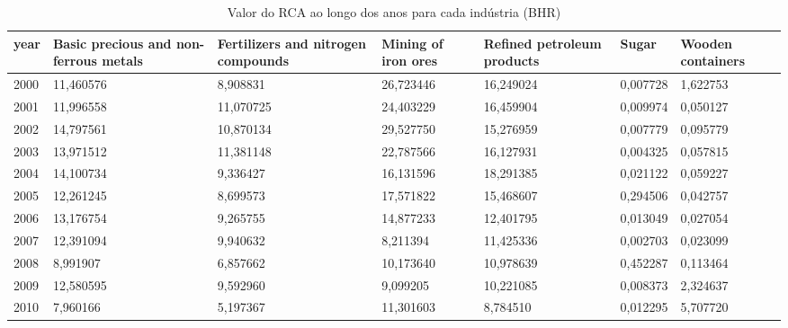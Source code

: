 \begin{table}
\centering
\caption{Valor do RCA ao longo dos anos para cada indústria (BHR)}
\begin{tabular}{p{1cm}p{2cm}p{2cm}p{2cm}p{2cm}p{2cm}p{2cm}}
\toprule
 year &  Basic precious and non-ferrous metals &  Fertilizers and nitrogen compounds &  Mining of iron ores &  Refined petroleum products &    Sugar &  Wooden containers \\
\midrule
 2000 &                              11,460576 &                            8,908831 &            26,723446 &                   16,249024 & 0,007728 &           1,622753 \\
 2001 &                              11,996558 &                           11,070725 &            24,403229 &                   16,459904 & 0,009974 &           0,050127 \\
 2002 &                              14,797561 &                           10,870134 &            29,527750 &                   15,276959 & 0,007779 &           0,095779 \\
 2003 &                              13,971512 &                           11,381148 &            22,787566 &                   16,127931 & 0,004325 &           0,057815 \\
 2004 &                              14,100734 &                            9,336427 &            16,131596 &                   18,291385 & 0,021122 &           0,059227 \\
 2005 &                              12,261245 &                            8,699573 &            17,571822 &                   15,468607 & 0,294506 &           0,042757 \\
 2006 &                              13,176754 &                            9,265755 &            14,877233 &                   12,401795 & 0,013049 &           0,027054 \\
 2007 &                              12,391094 &                            9,940632 &             8,211394 &                   11,425336 & 0,002703 &           0,023099 \\
 2008 &                               8,991907 &                            6,857662 &            10,173640 &                   10,978639 & 0,452287 &           0,113464 \\
 2009 &                              12,580595 &                            9,592960 &             9,099205 &                   10,221085 & 0,008373 &           2,324637 \\
 2010 &                               7,960166 &                            5,197367 &            11,301603 &                    8,784510 & 0,012295 &           5,707720 \\

\end{tabular}
\end{table}
